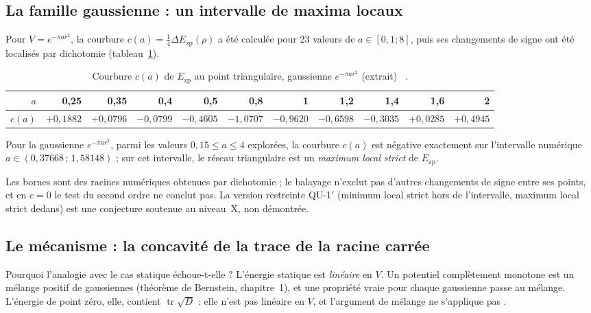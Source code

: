 \subsection{La famille gaussienne : un intervalle de maxima locaux \tierX}\label{ch3:sec:intervalle}
Pour $V=e^{-\pi ar^2}$, la courbure $c(a)=\tfrac14\Delta E_{\mathrm{zp}}(\rho)$ a été calculée pour 23 valeurs de
$a\in[0{,}1;8]$, puis ses changements de signe ont été localisés par dichotomie (tableau~\ref{ch3:tab:ca}).
\begin{table}[ht]\centering\small
\caption{Courbure $c(a)$ de $E_{\mathrm{zp}}$ au point triangulaire, gaussienne $e^{-\pi ar^2}$ (extrait) \tierX~\cite{ch3-p2zp}.}\label{ch3:tab:ca}
\setlength{\tabcolsep}{3pt}\begin{tabular}{rrrrrrrrrrr}\toprule
$a$ & 0,25 & 0,35 & 0,4 & 0,5 & 0,8 & 1 & 1,2 & 1,4 & 1,6 & 2\\\midrule
$c(a)$ & $+0{,}1882$ & $+0{,}0796$ & $-0{,}0799$ & $-0{,}4605$ & $-1{,}0707$ & $-0{,}9620$ & $-0{,}6598$ & $-0{,}3035$ & $+0{,}0285$ & $+0{,}4945$\\
\bottomrule\end{tabular}
\end{table}

\begin{proposition}\label{ch3:prop:intervalle}
Pour la gaussienne $e^{-\pi ar^2}$, parmi les valeurs $0{,}15\le a\le4$ explorées, la courbure $c(a)$ est négative exactement
sur l'intervalle numérique $a\in(0{,}37668\,;\,1{,}58148)$ ; sur cet intervalle, le réseau triangulaire est un
\emph{maximum local strict} de $E_{\mathrm{zp}}$. \tierX
\end{proposition}
\noindent Les bornes sont des racines numériques obtenues par dichotomie ; le balayage n'exclut pas d'autres changements
de signe entre ses points, et en $c=0$ le test du second ordre ne conclut pas. La version restreinte QU-1$'$ (minimum
local strict hors de l'intervalle, maximum local strict dedans) est une conjecture soutenue au niveau~X, non démontrée.

\subsection{Le mécanisme : la concavité de la trace de la racine carrée}\label{ch3:sec:mecanisme}
Pourquoi l'analogie avec le cas statique échoue-t-elle ? L'énergie statique est \emph{linéaire} en $V$. Un potentiel
complètement monotone est un mélange positif de gaussiennes (théorème de Bernstein, chapitre~1), et une propriété vraie
pour chaque gaussienne passe au mélange. L'énergie de point zéro, elle, contient $\operatorname{tr}\sqrt{D}$ : elle n'est
pas linéaire en $V$, et l'argument de mélange ne s'applique pas \tierC.

